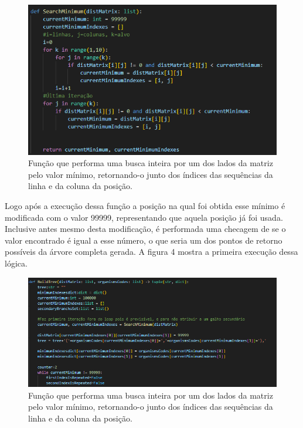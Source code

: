 \documentclass[brazilian,12pt,a4paper,final]{article}
\begin{document}
	\begin{figure}[hbtp]
		\begin{center}
			\includegraphics[]{SearchMinimum.png}
			\caption{Função que performa uma busca inteira por um dos lados da matriz pelo valor mínimo, retornando-o junto dos índices das sequências da linha e da coluna da posição.}
			\label{fig}
		\end{center}
	\end{figure}
	
	Logo após a execução dessa função a posição na qual foi obtida esse mínimo é modificada com o valor 99999, representando que aquela posição já foi usada. Inclusive antes mesmo desta modificação, é performada uma checagem de se o valor encontrado é igual a esse número, o que seria um dos pontos de retorno possíveis da árvore completa gerada. A figura 4 mostra a primeira execução dessa lógica.
	
	\begin{figure}[hbtp]
		\begin{center}
			\includegraphics[width=15cm]{BuildTree.png}
			\caption{Função que performa uma busca inteira por um dos lados da matriz pelo valor mínimo, retornando-o junto dos índices das sequências da linha e da coluna da posição.}
			\label{fig}
		\end{center}
	\end{figure}
	
\end{document}
